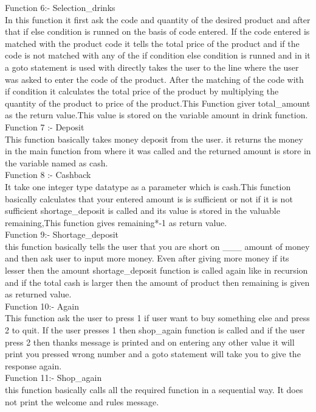 \documentclass[10pt,a4paper]{article}
\begin{document}
\begin{flushleft}
\bigskip
Function 6:- Selection\_drinks\\
In this function it first ask the code and quantity of the desired product and after that if else condition is runned on the basis of code entered. If the code entered is matched with the product code it tells the total price of the product and if the code is not matched with any of the if condition else condition is runned and in it a goto statement is used with directly takes the user to the line where the user was asked to enter the code of the product.
After the matching of the code with if condition it calculates the total price of the product by multiplying the quantity of the product to price of the product.This Function giver total\_amount as the return value.This value is stored on the variable amount in drink function.\\
\bigskip
Function 7 :- Deposit\\
This function basically takes money deposit from the user. it returns the money in the main function from where it was called and the returned amount is store in the variable named as cash.\\
\bigskip
Function 8 :- Cashback\\
It take one integer type datatype as a parameter which is cash.This function basically calculates that your entered amount is is sufficient or not if it is not sufficient shortage\_deposit is called and its value is stored in the valuable remaining,This function gives remaining*-1 as return value.\\
\bigskip
Function 9:- Shortage\_deposit\\
this function basically tells the user that you are short on \_\_\_ amount of money and then ask user to input more money. Even after giving more money if its lesser then the amount shortage\_deposit function is called again like in recursion and if the total cash is larger then the amount of product then remaining is given as returned value.\\
\bigskip
Function 10:- Again \\
This function ask the user to press 1 if user want to buy something else and press 2 to quit. If the user presses 1 then shop\_again function is called and if the user press 2 then thanks message is printed and on entering any other value it will print you pressed wrong number and a goto statement will take you to give the response again.\\
\bigskip
Function 11:- Shop\_again\\
this function basically calls all the required function in a sequential way. It does not print the welcome and rules message. 

\end{flushleft}
\end{document}
